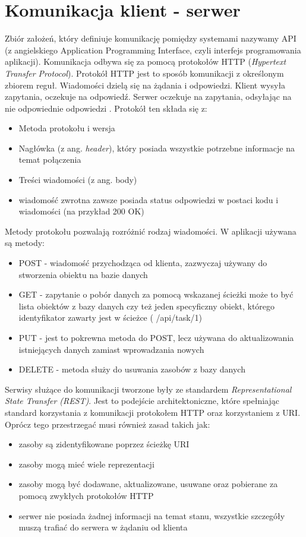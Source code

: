 \section{Komunikacja klient - serwer}
Zbiór założeń, który definiuje komunikację pomiędzy systemami nazywamy API (z angielskiego Application Programming Interface, czyli interfejs programowania aplikacji).  Komunikacja odbywa się za pomocą protokołów HTTP (\textit{Hypertext Transfer Protocol}). Protokół HTTP jest to sposób komunikacji z określonym zbiorem reguł. Wiadomości dzielą się na żądania i odpowiedzi. Klient wysyła zapytania, oczekuje na odpowiedź. Serwer oczekuje na zapytania, odsyłając na nie odpowiednie odpowiedzi \cite{rfc7230}.
\newline
Protokół ten składa się z:
\begin{itemize}
	\item Metoda protokołu i wersja
	\item Nagłówka (z ang. \textit{header}), który posiada wszystkie potrzebne informacje na temat połączenia
	\item Treści wiadomości (z ang. body)
	\item wiadomość zwrotna zawsze posiada status odpowiedzi w postaci kodu i wiadomości (na przykład 200 OK)
\end{itemize}
Metody protokołu pozwalają rozróżnić rodzaj wiadomości. W aplikacji używana są metody:
\begin{itemize}
	\item POST  - wiadomość przychodząca od klienta, zazwyczaj używany do stworzenia obiektu na bazie danych
	\item GET - zapytanie o pobór danych za pomocą wskazanej ścieżki
	może to być lista obiektów z bazy danych czy też jeden specyficzny obiekt, którego identyfikator zawarty jest w ścieżce ( /api/task/1)
	\item PUT - jest to pokrewna metoda do POST, lecz używana do aktualizowania istniejących danych zamiast wprowadzania nowych
	\item DELETE - metoda służy do usuwania zasobów z bazy danych
\end{itemize}
Serwisy służące do komunikacji tworzone były ze standardem  \textit{Representational
State Transfer (REST)}. Jest to podejście architektoniczne, które spełniając standard korzystania z komunikacji protokołem HTTP oraz korzystaniem z URI. Oprócz tego przestrzegać musi również zasad takich jak:
\begin{itemize}
	\item  zasoby są zidentyfikowane poprzez ścieżkę URI
	\item  zasoby mogą mieć wiele reprezentacji
	\item  zasoby mogą być dodawane, aktualizowane, usuwane oraz pobierane za pomocą zwykłych protokołów HTTP
	\item serwer nie posiada żadnej informacji na temat stanu, wszystkie szczegóły muszą trafiać do serwera w żądaniu od klienta
\end{itemize}

